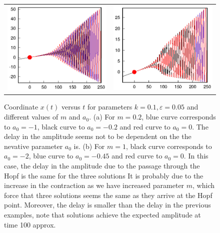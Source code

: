 \documentclass[a4paper,preprint,11pt]{article}
\begin{document}
\begin{figure}[h!]
  \begin{tabular}{cc}
    \includegraphics[width=6.5cm]{Sp_PWL_dibu2.eps} 
    &
    \includegraphics[width=6.5cm]{Sp_PWL_dibu3.eps}
  \end{tabular}
  \caption{Coordinate $x(t)$ versus $t$ for parameters $k=0.1,\varepsilon=0.05$ and different values of $m$ and $a_0$. (a) For $m=0.2$, blue curve corresponds to $a_0=-1$, black curve to $a_0=-0.2$ and red curve to $a_0=0$. The delay in the amplitude seems not to be dependent on the the nevative parameter $a_0$ is. (b) For $m=1$, black curve corresponds to $a_0=-2$, blue curve to $a_0=-0.45$ and red curve to $a_0=0$. In this case, the delay in the amplitude due to the passage through the Hopf is the same for the three solutions It is probably due to the increase in the contraction as we have increased parameter $m$, which force that three solutions seems the same as they arrive at the Hopf point. Moreover, the delay is smaller than the delay in the previous examples, note that solutions achieve the expected amplitude at time 100 approx.}
\end{figure}
\end{document}
